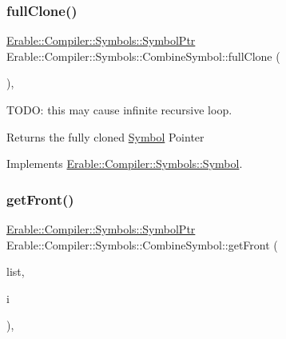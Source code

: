 \subsubsection{\texorpdfstring{fullClone()}{fullClone()}}
{\footnotesize\ttfamily \mbox{\hyperlink{namespace_erable_1_1_compiler_1_1_symbols_a8f0bc762f448ea4d84e8713ab3e140b9}{Erable\+::\+Compiler\+::\+Symbols\+::\+Symbol\+Ptr}} Erable\+::\+Compiler\+::\+Symbols\+::\+Combine\+Symbol\+::full\+Clone (\begin{DoxyParamCaption}{ }\end{DoxyParamCaption})\hspace{0.3cm}{\ttfamily [override]}, {\ttfamily [virtual]}}

T\+O\+DO\+: this may cause infinite recursive loop. \begin{DoxyReturn}{Returns}
the fully cloned \mbox{\hyperlink{class_erable_1_1_compiler_1_1_symbols_1_1_symbol}{Symbol}} Pointer 
\end{DoxyReturn}


Implements \mbox{\hyperlink{class_erable_1_1_compiler_1_1_symbols_1_1_symbol_a23ed5c4b948000c29af03c846abc12fc}{Erable\+::\+Compiler\+::\+Symbols\+::\+Symbol}}.

\mbox{\label{struct_erable_1_1_compiler_1_1_symbols_1_1_combine_symbol_a38911131d702965f629c2b30c60f3aea}} 
\subsubsection{\texorpdfstring{getFront()}{getFront()}}
{\footnotesize\ttfamily \mbox{\hyperlink{namespace_erable_1_1_compiler_1_1_symbols_a8f0bc762f448ea4d84e8713ab3e140b9}{Erable\+::\+Compiler\+::\+Symbols\+::\+Symbol\+Ptr}} Erable\+::\+Compiler\+::\+Symbols\+::\+Combine\+Symbol\+::get\+Front (\begin{DoxyParamCaption}\item[{\mbox{\hyperlink{namespace_erable_1_1_compiler_1_1_symbols_a63e8157d2f729d4689d27bacad42f8ed}{Symbol\+List}} \&}]{list,  }\item[{int}]{i }\end{DoxyParamCaption})\hspace{0.3cm}{\ttfamily [override]}, {\ttfamily [virtual]}}



